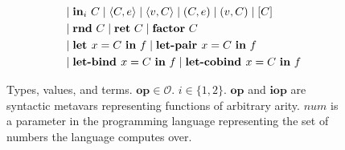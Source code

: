 \begin{figure}[tbp]
\begin{alignat*}{3}
         & & &
         \mid \mathbf{in}_i~C
         \mid \langle C, e \rangle
         \mid \langle v, C \rangle
         \mid (C, e)
         \mid (v, C)
         \mid [ C ] \\
         & & &
         \mid \mathbf{rnd}~C 
         \mid \mathbf{ret}~C 
         \mid \mathbf{factor}~C \\ 
         & & &
         \mid \textbf{let } x = C \ \textbf{in} \ f
         \mid \textbf{let-pair } x = C \ \textbf{in} \ f \\
         & & &
         \mid \textbf{let-bind } x = C \ \textbf{in} \ f
         \mid \textbf{let-cobind } x = C \ \textbf{in} \ f \\
  \end{alignat*}
  \caption{
    Types, values, and terms. $\mathbf{op} \in \mathcal{O}$. $i \in \{1, 2\}$.
    $\textbf{op}$ and $\textbf{iop}$ are syntactic metavars representing
    functions of arbitrary arity.
    $\textit{num}$ is a parameter in the programming language representing the
    set of numbers the language computes over.
  }
  \label{fig:syntax}
\end{figure}
